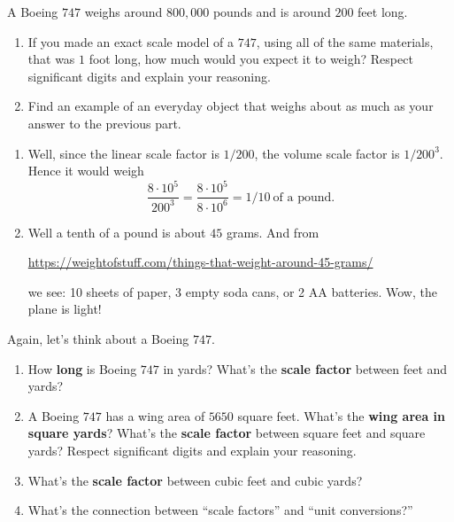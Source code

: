 \documentclass[,nooutcomes,noauthor,hints,12pt,handout]{ximera}
\begin{document}
\begin{question}
  A Boeing $747$ weighs around $800,000$ pounds and is around $200$
  feet long.
  \begin{enumerate}
    \item If you made an exact scale model of a $747$, using all of
      the same materials, that was $1$ foot long, how much would you
      expect it to weigh? Respect significant digits and explain your reasoning.
    \item Find an example of an everyday object that weighs about as
      much as your answer to the previous part.
  \end{enumerate}
      \begin{freeResponse}
        \begin{enumerate}
          \item Well, since the linear scale factor is $1/200$, the volume scale
          factor is $1/200^3$. Hence it would weigh
          \[
          \frac{8\cdot10^5}{200^3} =\frac{8\cdot10^5}{8\cdot 10^6}=1/10~\text{of a pound.}
          \]
        \item Well a tenth of a pound is about $45$ grams. And from
          \begin{center}
          \url{https://weightofstuff.com/things-that-weight-around-45-grams/}
          \end{center}
          we see: 10 sheets of paper, 3 empty soda cans, or 2 AA
          batteries. Wow, the plane is light!
        \end{enumerate}
        \end{freeResponse}
\end{question}
\mynewpage



\begin{question}
  Again, let's think about a Boeing $747$.
  \begin{enumerate}
  \item How \textbf{long} is Boeing $747$ in yards? What's the \textbf{scale factor} between feet and yards?
  \item A Boeing $747$ has a wing area of $5650$ square feet. What's the
    \textbf{wing area in square yards}? What's the \textbf{scale factor} between square
    feet and square yards? Respect significant digits and explain your reasoning.
  \item What's the \textbf{scale factor} between cubic feet and cubic yards?
  \item What's the connection between ``scale factors'' and ``unit conversions?''
  \end{enumerate}
\end{question}
\end{document}
